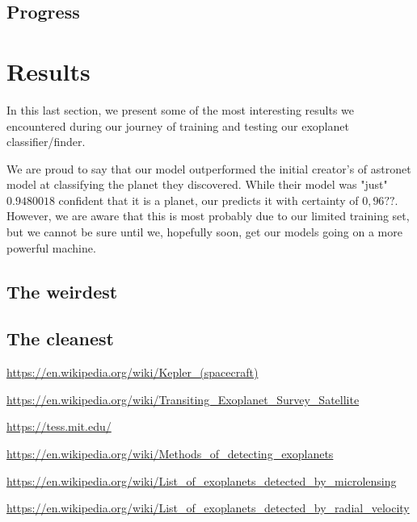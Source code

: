\documentclass[twoside]{article}
\begin{document}
\begin{multicols}{2}
\subsection{Progress}


\section{Results}
In this last section, we present some of the most interesting results we encountered during our journey of training and testing our exoplanet classifier/finder.

We are proud to say that our model outperformed the initial creator's of astronet model at classifying the planet they discovered. While their model was "just" $0.9480018$ confident that it is a planet, our predicts it with certainty of $0,96??$. However, we are aware that this is most probably due to our limited training set, but we cannot be sure until we, hopefully soon, get our models going on a more powerful machine.

\subsection{The weirdest}

\subsection{The cleanest}



\begin{thebibliography}{99}

\url{https://en.wikipedia.org/wiki/Kepler_(spacecraft)}

\url{https://en.wikipedia.org/wiki/Transiting_Exoplanet_Survey_Satellite}

\url{https://tess.mit.edu/}

\url{https://en.wikipedia.org/wiki/Methods_of_detecting_exoplanets}

\url{https://en.wikipedia.org/wiki/List_of_exoplanets_detected_by_microlensing}

\url{https://en.wikipedia.org/wiki/List_of_exoplanets_detected_by_radial_velocity}


\end{thebibliography}
\end{multicols}
\end{document}
